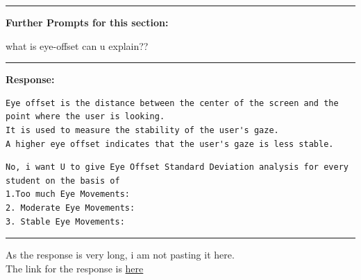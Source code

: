 \documentclass[11pt,a4paper]{article}
\begin{document}
\begin{itemize}
{            \begin{tcolorbox}[title=Response]
                
            \end{tcolorbox}
            \begin{center}
                \color{red}\rule{1\linewidth}{0.5mm}
            \end{center}
            \textbf{Further Prompts for this section:}
            \begin{tcolorbox}[title= prompt]
                what is eye-offset can u explain??
            \end{tcolorbox}
         
            \begin{center}
                \color{red}\rule{1\linewidth}{0.5mm}
            \end{center}
            \textbf{Response:}
            \begin{tcolorbox}[title= response]
                \begin{lstlisting}
Eye offset is the distance between the center of the screen and the point where the user is looking. 
It is used to measure the stability of the user's gaze. 
A higher eye offset indicates that the user's gaze is less stable.
                \end{lstlisting}
            \end{tcolorbox}



\begin{tcolorbox}[title= Prompts for analysing gaze\_df:]
\begin{lstlisting}
No, i want U to give Eye Offset Standard Deviation analysis for every student on the basis of 
1.Too much Eye Movements:
2. Moderate Eye Movements:
3. Stable Eye Movements:
\end{lstlisting}
\end{tcolorbox}
\begin{center}
    \color{red}\rule{1\linewidth}{0.5mm}
\end{center}
\begin{tcolorbox}[title=response]
    As the response is very long, i am not pasting it here.\\
    The link for the response is \href{https://chatgpt.com/share/66eacd2e-b8f8-8009-8507-b3895c422e0b}{here}


\end{tcolorbox}}
\end{itemize}
\end{document}
